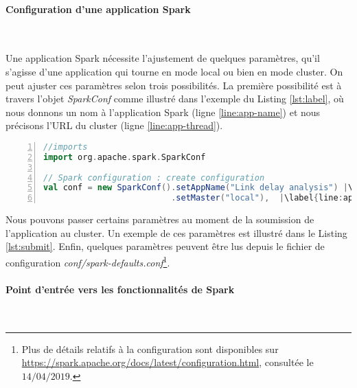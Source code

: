 \paragraph{Configuration d'une application  Spark}~

Une application Spark nécessite l'ajustement de quelques paramètres, qu'il s'agisse d'une application qui tourne en mode local ou bien en mode cluster. 
 On peut ajuster ces paramètres selon trois possibilités. La première possibilité est à travers l'objet \textit{SparkConf} comme illustré dans l'exemple du Listing \ref{lst:label}, où nous donnons un nom à l'application Spark (ligne \ref{line:app-name}) et nous précisons l'URL du cluster (ligne \ref{line:app-thread}). 

\begin{lstlisting}[language=scala,firstnumber=1, caption={Exemple de configuration avec SparkConf},label={lst:label}, basicstyle = \footnotesize,escapechar=|,numbers=left,
stepnumber=1,numberstyle=\scriptsize]
//imports
import org.apache.spark.SparkConf

// Spark configuration : create configuration
val conf = new SparkConf().setAppName("Link delay analysis") |\label{line:app-name}|
                          .setMaster("local"),  |\label{line:app-thread}|
\end{lstlisting}

Nous pouvons passer certains paramètres au moment de la soumission de l'application au cluster.  Un exemple de ces paramètres est illustré dans le Listing \ref{lst:submit}. Enfin, quelques paramètres peuvent être lus depuis le fichier de configuration  \textit{conf/spark-defaults.conf}\footnote{Plus de détails relatifs à la configuration sont disponibles sur \url{https://spark.apache.org/docs/latest/configuration.html}, consultée le $14/04/2019$.}. 





\paragraph{Point d'entrée vers les fonctionnalités de Spark}~

